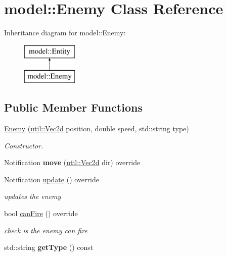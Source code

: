\hypertarget{classmodel_1_1_enemy}{}\section{model\+:\+:Enemy Class Reference}
\label{classmodel_1_1_enemy}
Inheritance diagram for model\+:\+:Enemy\+:\begin{figure}[H]
\begin{center}
\leavevmode
\includegraphics[height=2.000000cm]{d9/d45/classmodel_1_1_enemy}
\end{center}
\end{figure}
\subsection*{Public Member Functions}
\begin{DoxyCompactItemize}
\item 
\mbox{\hyperlink{classmodel_1_1_enemy_a871c65eccf987943a5c79d7f7cce990b}{Enemy}} (\mbox{\hyperlink{classutil_1_1_vec2}{util\+::\+Vec2d}} position, double speed, std\+::string type)
\begin{DoxyCompactList}\small\item\em Constructor. \end{DoxyCompactList}\item 
\mbox{\label{classmodel_1_1_enemy_a4f6fa1e31f46c74e7d531a8ee2211ab7}} 
Notification {\bfseries move} (\mbox{\hyperlink{classutil_1_1_vec2}{util\+::\+Vec2d}} dir) override
\item 
Notification \mbox{\hyperlink{classmodel_1_1_enemy_ad94553dfee4e98ca717428d649274055}{update}} () override
\begin{DoxyCompactList}\small\item\em updates the enemy \end{DoxyCompactList}\item 
bool \mbox{\hyperlink{classmodel_1_1_enemy_ad6bf0e92f05474a65e6f9f027c5ae3a1}{can\+Fire}} () override
\begin{DoxyCompactList}\small\item\em check is the enemy can fire \end{DoxyCompactList}\item 
\mbox{\label{classmodel_1_1_enemy_ae19b693b46f8cf4851c82435f591cdd3}} 
std\+::string {\bfseries get\+Type} () const
\end{DoxyCompactItemize}
